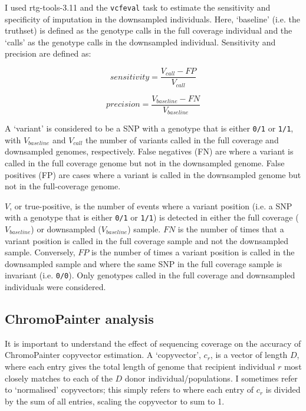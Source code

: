 I used rtg-tools-3.11 \cite{cleary2014joint} and the \texttt{vcfeval} task to estimate the sensitivity and specificity of imputation in the downsampled individuals. Here, `baseline' (i.e. the truthset) is defined as the genotype calls in the full coverage individual and the `calls' as the genotype calls in the downsampled individual. Sensitivity and precision are defined as: 

\begin{equation}
sensitivity = \frac{V_{call}-FP}{V_{call}}
\end{equation}

\begin{equation}
precision = \frac{V_{baseline}-FN}{V_{baseline}}
\end{equation}

A `variant' is considered to be a SNP with a genotype that is either \texttt{0/1} or \texttt{1/1}, with $V_{baseline}$ and $V_{call}$ the number of variants called in the full coverage and downsampled genomes, respectively. False negatives (FN) are where a variant is called in the full coverage genome but not in the downsampled genome. False positives (FP) are cases where a variant is called in the downsampled genome but not in the full-coverage genome.

$V$, or true-positive, is the number of events where a variant position (i.e. a SNP with a genotype that is either \texttt{0/1} or \texttt{1/1}) is detected in either the full coverage ($V_{baseline}$) or downsampled ($V_{baseline}$) sample. $FN$ is the number of times that a variant position is called in the full coverage sample and not the downsampled sample. Conversely, $FP$ is the number of times a variant position is called in the downsampled sample and where the same SNP in the full coverage sample is invariant (i.e. \texttt{0/0}). Only genotypes called in the full coverage and downsampled individuals were considered. 


\subsection{ChromoPainter analysis} \label{ChromoPainter_analysis}

It is important to understand the effect of sequencing coverage on the accuracy of ChromoPainter copyvector estimation. A `copyvector', $c_{r}$, is a vector of length $D$, where each entry gives the total length of genome that recipient individual $r$ most closely matches to each of the $D$ donor individual/populations. I sometimes refer to `normalised' copyvectors; this simply refers to where each entry of $c_r$ is divided by the sum of all entries, scaling the copyvector to sum to 1. 

